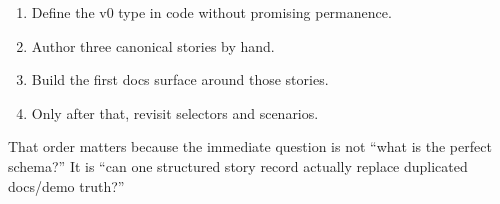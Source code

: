 \begin{enumerate}
\def\labelenumi{\arabic{enumi}.}
\tightlist
\item
  Define the v0 type in code without promising permanence.
\item
  Author three canonical stories by hand.
\item
  Build the first docs surface around those stories.
\item
  Only after that, revisit selectors and scenarios.
\end{enumerate}

That order matters because the immediate question is not ``what is the perfect schema?'' It is ``can one structured story record actually replace duplicated docs/demo truth?''

